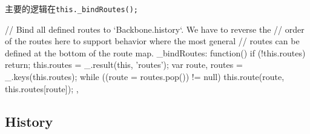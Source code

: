主要的逻辑在\lstinline$this._bindRoutes();$


\begin{JavaScript}
    // Bind all defined routes to `Backbone.history`. We have to reverse the
    // order of the routes here to support behavior where the most general
    // routes can be defined at the bottom of the route map.
    _bindRoutes: function() {
      if (!this.routes) return;
      this.routes = _.result(this, 'routes');
      var route, routes = _.keys(this.routes);
      while ((route = routes.pop()) != null) {
        this.route(route, this.routes[route]);
      }
    },
\end{JavaScript}


\subsection{History}